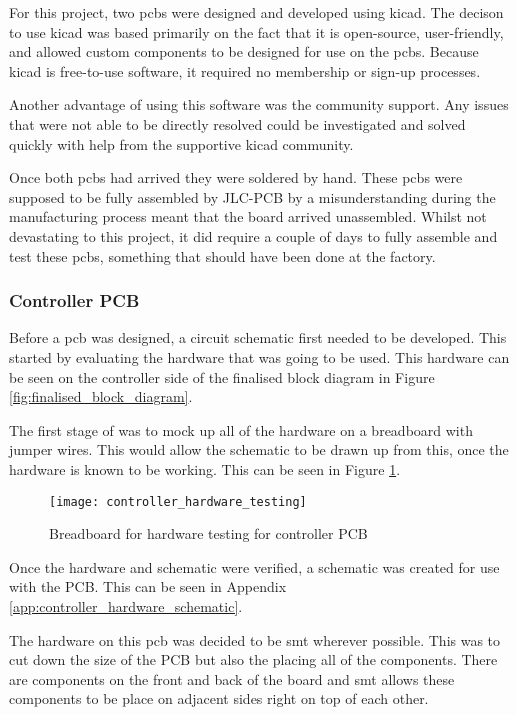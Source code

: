 \documentclass [11pt]{article}
\begin{document}
For this project, two \gls{pcb}s were designed and developed using \gls{kicad}. The decison to use \gls{kicad} was based primarily on the fact that it is open-source, user-friendly, and allowed custom components to be designed for use on the \gls{pcb}s. Because \gls{kicad} is free-to-use software, it required no membership or sign-up processes. 

Another advantage of using this software was the community support. Any issues that were not able to be directly resolved could be investigated and solved quickly with help from the supportive \gls{kicad} community. 

Once both \gls{pcb}s had arrived they were soldered by hand. These \gls{pcb}s were supposed to be fully assembled by JLC-PCB by a misunderstanding during the manufacturing process meant that the board arrived unassembled. Whilst not devastating to this project, it did require a couple of days to fully assemble and test these \gls{pcb}s, something that should have been done at the factory.   


\subsubsection{Controller PCB}

Before a \gls{pcb} was designed, a circuit schematic first needed to be developed. This started by evaluating the hardware that was going to be used. This hardware can be seen on the controller side of the finalised block diagram in Figure \ref{fig:finalised_block_diagram}.

The first stage of was to mock up all of the hardware on a breadboard with jumper wires. This would allow the schematic to be drawn up from this, once the hardware is known to be working. This can be seen in Figure \ref{fig:controller_hardware_testing}.

\begin{figure}[H]
\centerline{\texttt{[image: controller\_hardware\_testing]}}
\caption{Breadboard for hardware testing for controller PCB}
\label{fig:controller_hardware_testing}
\end{figure}

Once the hardware and schematic were verified, a schematic was created for use with the PCB. This can be seen in Appendix \ref{app:controller_hardware_schematic}.

The hardware on this \gls{pcb} was decided to be \gls{smt} wherever possible. This was to cut down the size of the PCB but also the placing all of the components. There are components on the front and back of the board and \gls{smt} allows these components to be place on adjacent sides right on top of each other. 
\end{document}
